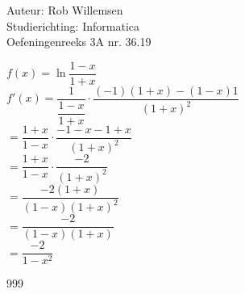 \documentclass[a4paper]{article}
\begin{document}
\noindent \large Auteur: Rob Willemsen \\
\noindent \large Studierichting: Informatica \\
\noindent \large Oefeningenreeks 3A nr. 36.19 \\

\medskip

\normalsize

$f(x) = \ln\dfrac{1-x}{1+x}$ \\

$f'(x) = \dfrac{1}{\dfrac{1-x}{1+x}} \cdot \dfrac{(-1)(1+x) - (1-x)1}{(1+x)^2}$ \\

$= \dfrac{1+x}{1-x} \cdot \dfrac{-1-x-1+x}{(1+x)^2}$ \\

$= \dfrac{1+x}{1-x} \cdot \dfrac{-2}{(1+x)^2}$ \\

$= \dfrac{-2(1+x)}{(1-x)(1+x)^2}$ \\

$= \dfrac{-2}{(1-x)(1+x)}$ \\

$= \dfrac{-2}{1-x^2}$ \\

\begin{thebibliography}{999}
\end{thebibliography}
\end{document}

